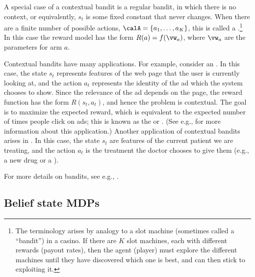 A special case of a contextual bandit is a regular bandit,
in which there is no context, or equivalently, $s_t$ is
some fixed constant that never changes.
When there are a finite number of possible actions,
$\calA=\{a_1,\ldots,a_K\}$,
this is called a .\footnote{
%
The terminology arises by analogy to a slot machine
(sometimes called a ``bandit'')
in a casino.
If there are $K$ slot machines, each with different rewards
(payout rates), then the agent (player) must explore
the different machines until they have discovered
which one is best, and can then stick to exploiting it.
}
In this case the reward model  has the form $R(a) = f(\vw_a)$,
where $\vw_a$ are the parameters for arm $a$.



Contextual bandits have many applications.
For example, consider an .
In this case, the state $s_t$ represents features
of the web page
that the user is currently looking at,
and the action $a_t$ represents the identity
of the  ad which the system
chooses to show.
Since the relevance of the ad depends on the page,
the reward function has the form $R(s_t,a_t)$,
and hence  the problem is contextual.
The goal is to maximize the expected reward,
which is equivalent to the expected number of times people click on
ads; this is known as
 the  or .
(See e.g.,  \citep{Graepel10,Li10linucb,McMahan13,Agarwal2014laser,Du2021ads,Yang2022CTR}
for more information about this application.)
Another application of contextual bandits
arises in 
\citep{Villar2015}.
In this case, the state $s_t$ are features of the current patient we are treating,
and the action $a_t$ is the treatment the doctor chooses to give them
(e.g., a new drug or a ).

For more details on bandits,
see e.g., \citep{Lattimore2019,Slivkins2019}.


\subsection{Belief state MDPs}
\label{sec:beliefStateMDP}

